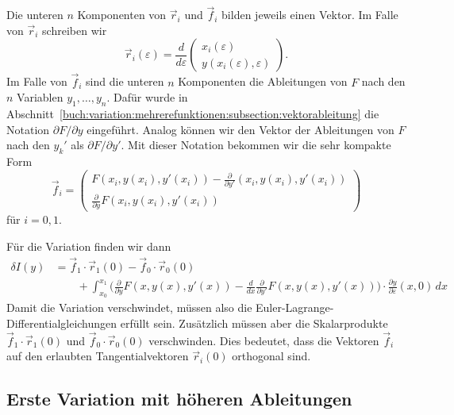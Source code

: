 Die unteren $n$ Komponenten von $\vec{r}_i$ und $\vec{f}_i$ bilden jeweils
einen Vektor.
Im Falle von $\vec{r}_i$ schreiben wir
\[
\vec{r}_i(\varepsilon)
=
\frac{d}{d\varepsilon}
\begin{pmatrix}
x_i(\varepsilon)\\
y(x_i(\varepsilon),\varepsilon)
\end{pmatrix}.
\]
Im Falle von $\vec{f}_i$ sind die unteren $n$ Komponenten
die Ableitungen von $F$ nach den $n$ Variablen $y_1,\dots,y_n$.
Dafür wurde in
Abschnitt~\ref{buch:variation:mehrerefunktionen:subsection:vektorableitung}
die Notation $\partial F/\partial y$ eingeführt.
Analog können wir den Vektor der Ableitungen von $F$ nach den
$y_k'$ als $\partial F/\partial y'$.
Mit dieser Notation bekommen wir die sehr kompakte Form
\[
\vec{f}_i
=
\begin{pmatrix}
\displaystyle
F(x_i,y(x_i),y'(x_i)) - \frac{\partial}{\partial y'}(x_i,y(x_i),y'(x_i))
\\[5pt]
\displaystyle
\frac{\partial}{\partial y} F(x_i,y(x_i),y'(x_i))
\end{pmatrix}
\]
für $i=0,1$.

Für die Variation finden wir dann
\begin{align*}
\delta I(y)
&=
\vec{f}_1\cdot \vec{r}_1(0)
-
\vec{f}_0\cdot \vec{r}_0(0)
\\
&\qquad
+
\int_{x_0}^{x_1}
\biggl(
\frac{\partial}{\partial y}F(x,y(x),y'(x))
-
\frac{d}{dx}
\frac{\partial}{\partial y'}F(x,y(x),y'(x))
\biggr)
\cdot
\frac{\partial y}{\partial\varepsilon}(x,0)
\,dx
\end{align*}
Damit die Variation verschwindet, müssen also die
Euler-Lagrange-Differentialgleichungen erfüllt sein.
Zusätzlich müssen aber die Skalarprodukte
$\vec{f}_1\cdot \vec{r}_1(0)$
und
$\vec{f}_0\cdot \vec{r}_0(0)$
verschwinden.
Dies bedeutet, dass die Vektoren $\vec{f}_i$ auf den erlaubten
Tangentialvektoren $\vec{r}_i(0)$ orthogonal sind.


%
%
\subsection{Erste Variation mit höheren Ableitungen
\label{buch:variation:allgemein:subsection:var2h}}



